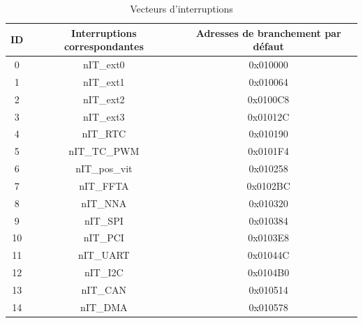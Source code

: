 \begin{table}[H]
	\centering
	\begin{tabular}{|c|c|c|}
		\hline
		ID & Interruptions correspondantes & Adresses de branchement par défaut\\
		\hline
		0 & nIT\_ext0 & 0x010000\\
		\hline
		1 & nIT\_ext1 & 0x010064\\
		\hline
		2 & nIT\_ext2 & 0x0100C8\\
		\hline
		3 & nIT\_ext3 & 0x01012C\\
		\hline
		4 & nIT\_RTC & 0x010190\\
		\hline
		5 & nIT\_TC\_PWM & 0x0101F4\\
		\hline
		6 & nIT\_pos\_vit & 0x010258\\
		\hline
		7 & nIT\_FFTA & 0x0102BC\\
		\hline
		8 & nIT\_NNA & 0x010320\\
		\hline
		9 & nIT\_SPI & 0x010384\\
		\hline
		10 & nIT\_PCI & 0x0103E8\\
		\hline
		11 & nIT\_UART & 0x01044C\\
		\hline
		12 & nIT\_I2C & 0x0104B0\\
		\hline
		13 & nIT\_CAN & 0x010514\\
		\hline
		14 & nIT\_DMA & 0x010578\\
		\hline
	\end{tabular}
	\caption{Vecteurs d'interruptions}
	\label{tab:vec_int}
\end{table}



